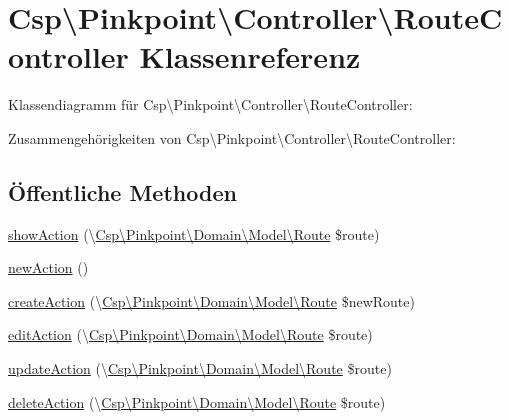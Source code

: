 \hypertarget{classCsp_1_1Pinkpoint_1_1Controller_1_1RouteController}{}\section{Csp\textbackslash{}Pinkpoint\textbackslash{}Controller\textbackslash{}Route\+Controller Klassenreferenz}
\label{classCsp_1_1Pinkpoint_1_1Controller_1_1RouteController}


Klassendiagramm für Csp\textbackslash{}Pinkpoint\textbackslash{}Controller\textbackslash{}Route\+Controller\+:


Zusammengehörigkeiten von Csp\textbackslash{}Pinkpoint\textbackslash{}Controller\textbackslash{}Route\+Controller\+:
\subsection*{Öffentliche Methoden}
\begin{DoxyCompactItemize}
\item 
\hyperlink{classCsp_1_1Pinkpoint_1_1Controller_1_1RouteController_aa6eb7fce35ec1a580c1476d7745f2c28}{show\+Action} (\textbackslash{}\hyperlink{classCsp_1_1Pinkpoint_1_1Domain_1_1Model_1_1Route}{Csp\textbackslash{}\+Pinkpoint\textbackslash{}\+Domain\textbackslash{}\+Model\textbackslash{}\+Route} \$route)
\item 
\hyperlink{classCsp_1_1Pinkpoint_1_1Controller_1_1RouteController_a63aa1874017f36c3c6369749d9ddf0e4}{new\+Action} ()
\item 
\hyperlink{classCsp_1_1Pinkpoint_1_1Controller_1_1RouteController_ab6d23c18874f1d1a89a37e6973ce30fc}{create\+Action} (\textbackslash{}\hyperlink{classCsp_1_1Pinkpoint_1_1Domain_1_1Model_1_1Route}{Csp\textbackslash{}\+Pinkpoint\textbackslash{}\+Domain\textbackslash{}\+Model\textbackslash{}\+Route} \$new\+Route)
\item 
\hyperlink{classCsp_1_1Pinkpoint_1_1Controller_1_1RouteController_aae4a905fb0a5a9d8c40bb8d3720474a1}{edit\+Action} (\textbackslash{}\hyperlink{classCsp_1_1Pinkpoint_1_1Domain_1_1Model_1_1Route}{Csp\textbackslash{}\+Pinkpoint\textbackslash{}\+Domain\textbackslash{}\+Model\textbackslash{}\+Route} \$route)
\item 
\hyperlink{classCsp_1_1Pinkpoint_1_1Controller_1_1RouteController_ad37ad96b222ed51ba4bb22e96f36b7cc}{update\+Action} (\textbackslash{}\hyperlink{classCsp_1_1Pinkpoint_1_1Domain_1_1Model_1_1Route}{Csp\textbackslash{}\+Pinkpoint\textbackslash{}\+Domain\textbackslash{}\+Model\textbackslash{}\+Route} \$route)
\item 
\hyperlink{classCsp_1_1Pinkpoint_1_1Controller_1_1RouteController_a6dd36680a41f2655d8e46488f2b687ad}{delete\+Action} (\textbackslash{}\hyperlink{classCsp_1_1Pinkpoint_1_1Domain_1_1Model_1_1Route}{Csp\textbackslash{}\+Pinkpoint\textbackslash{}\+Domain\textbackslash{}\+Model\textbackslash{}\+Route} \$route)
\end{DoxyCompactItemize}

